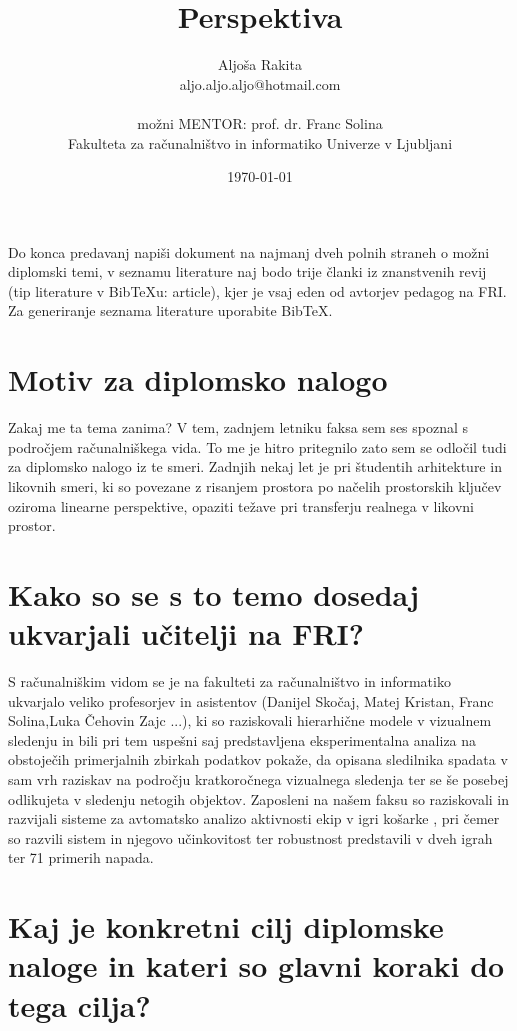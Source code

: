 \documentclass[11pt,a4paper]{article}
\title{Perspektiva}
\author{Aljoša Rakita\\
aljo.aljo.aljo@hotmail.com\\
\ \\
možni MENTOR: prof. dr. Franc Solina \\
Fakulteta za računalništvo in informatiko Univerze v Ljubljani
\date{\today}         
}
\begin{document}
\maketitle

Do konca predavanj napiši dokument na najmanj dveh polnih straneh o možni diplomski temi, v seznamu literature naj bodo trije članki iz znanstvenih revij
(tip literature v Bib\TeX u: article), kjer je vsaj eden od avtorjev pedagog na FRI. 
Za generiranje seznama literature uporabite Bib\TeX . 



\section{Motiv za diplomsko nalogo}

Zakaj me ta tema zanima? 
V tem, zadnjem letniku faksa sem ses spoznal s področjem računalniškega vida. To me je hitro pritegnilo zato sem se odločil tudi za diplomsko nalogo iz te smeri.
Zadnjih nekaj let je pri študentih arhitekture in likovnih smeri, ki so povezane z risanjem prostora po načelih prostorskih ključev oziroma linearne
perspektive, opaziti težave pri transferju realnega v likovni prostor.


\section{Kako so se s to temo dosedaj ukvarjali učitelji na FRI?}


S računalniškim vidom se je na fakulteti za računalništvo in informatiko ukvarjalo veliko profesorjev in asistentov (Danijel Skočaj, Matej Kristan, Franc Solina,Luka Čehovin Zajc ...), ki so raziskovali hierarhične modele v vizualnem sledenju \cite{hierarhicni} in bili pri tem uspešni saj predstavljena eksperimentalna analiza na obstoječih primerjalnih zbirkah podatkov pokaže, da opisana sledilnika spadata v sam vrh raziskav na področju kratkoročnega vizualnega sledenja ter se še posebej odlikujeta v sledenju netogih objektov.
Zaposleni na našem faksu so raziskovali in razvijali sisteme za avtomatsko analizo aktivnosti ekip v igri košarke \cite{pervse2009trajectory} , pri čemer so razvili sistem in njegovo učinkovitost ter robustnost predstavili v dveh igrah ter 71 primerih napada.


\section{Kaj je konkretni cilj diplomske naloge in kateri so glavni koraki do tega cilja?}
\end{document}
